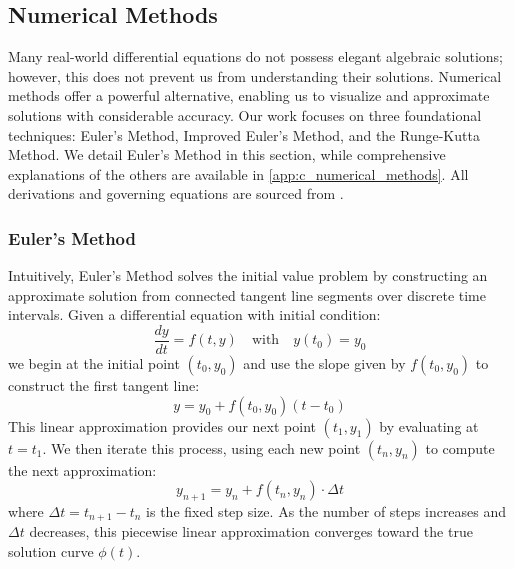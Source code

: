 \documentclass{article} %
\begin{document}
\begin{multicols}{2}
\subsection{Numerical Methods}
\label{subsec:numerical_methods}

Many real-world differential equations do not possess elegant algebraic solutions; however, this does not prevent us from understanding their solutions. 
Numerical methods offer a powerful alternative, enabling us to visualize and approximate solutions with considerable accuracy. 
Our work focuses on three foundational techniques: Euler's Method, Improved Euler's Method, and the Runge-Kutta Method. 
We detail Euler's Method in this section, while comprehensive explanations of the others are available in \ref{app:c_numerical_methods}. 
All derivations and governing equations are sourced from \cite{brannan2015differential}.

\subsubsection{Euler's Method}
\label{subsubsec:euler_method}

Intuitively, Euler's Method solves the initial value problem by constructing an approximate solution from connected tangent line segments over discrete time intervals. 
Given a differential equation with initial condition:
\[
    \frac{dy}{dt} = f(t, y) \quad \text{with} \quad y(t_0) = y_0
\]
we begin at the initial point $(t_0, y_0)$ and use the slope given by $f(t_0, y_0)$ to construct the first tangent line:
\[
    y = y_0 + f(t_0, y_0)(t - t_0)
\]
This linear approximation provides our next point $(t_1, y_1)$ by evaluating at $t = t_1$. We then iterate this process, using each new point $(t_n, y_n)$ to compute the next approximation:
\[
    y_{n+1} = y_n + f(t_n, y_n) \cdot \Delta t
\]
where $\Delta t = t_{n+1} - t_n$ is the fixed step size. 
As the number of steps increases and $\Delta t$ decreases, this piecewise linear approximation converges toward the true solution curve $\phi(t)$.

\label{last_page}

\newpage



\end{multicols}

\newpage
\appendix
\end{document}
